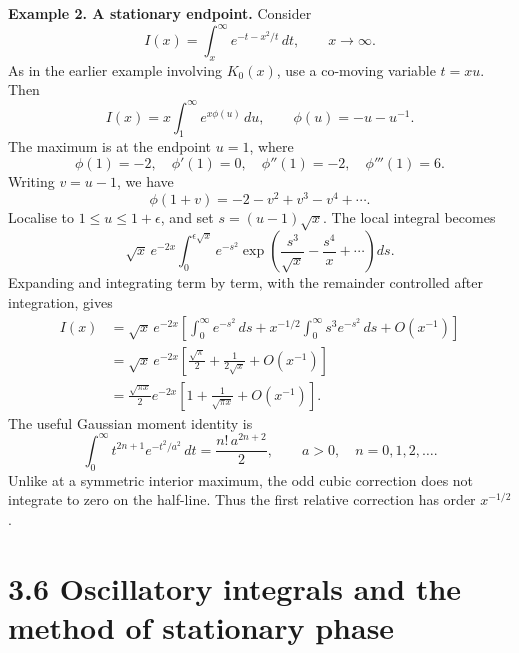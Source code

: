 \documentclass[11pt,a4paper]{article}
\begin{document}
\medskip
\noindent\textbf{Example 2. A stationary endpoint.}
Consider
\[
    I(x)=\int_x^\infty e^{-t-x^2/t}\,dt,\qquad x\to\infty.
\]
As in the earlier example involving $K_0(x)$, use a co-moving variable
$t=xu$. Then
\[
    I(x)=x\int_1^\infty e^{x\phi(u)}\,du,
    \qquad\phi(u)=-u-u^{-1}.
\]
The maximum is at the endpoint $u=1$, where
\[
    \phi(1)=-2,\quad\phi'(1)=0,\quad
    \phi''(1)=-2,\quad\phi'''(1)=6.
\]
Writing $v=u-1$, we have
\[
    \phi(1+v)=-2-v^2+v^3-v^4+\cdots.
\]
Localise to $1\leq u\leq1+\epsilon$, and set $s=(u-1)\sqrt{x}$.
The local integral becomes
\[
    \sqrt{x}\,e^{-2x}\int_0^{\epsilon\sqrt{x}}e^{-s^2}
    \exp\!\left(\frac{s^3}{\sqrt{x}}-\frac{s^4}{x}+\cdots\right)ds.
\]
Expanding and integrating term by term, with the remainder controlled
after integration, gives
\begin{align*}
    I(x)&=\sqrt{x}\,e^{-2x}\left[
    \int_0^\infty e^{-s^2}\,ds
    +x^{-1/2}\int_0^\infty s^3e^{-s^2}\,ds+O(x^{-1})\right]\\
    &=\sqrt{x}\,e^{-2x}\left[
    \frac{\sqrt{\pi}}{2}+\frac{1}{2\sqrt{x}}+O(x^{-1})\right]\\
    &=\boxed{\frac{\sqrt{\pi x}}{2}e^{-2x}
    \left[1+\frac{1}{\sqrt{\pi x}}+O(x^{-1})\right]}.
\end{align*}
The useful Gaussian moment identity is
\[
    \int_0^\infty t^{2n+1}e^{-t^2/a^2}\,dt
    =\frac{n!\,a^{2n+2}}{2},\qquad a>0,\quad n=0,1,2,\ldots.
\]
Unlike at a symmetric interior maximum, the odd cubic correction does
not integrate to zero on the half-line. Thus the first relative
correction has order $x^{-1/2}$.

\section*{3.6 Oscillatory integrals and the method of stationary phase}
\end{document}

